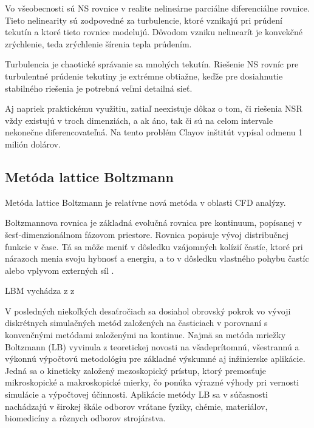 \documentclass[]{tukediphc}
\begin{document}
Vo všeobecnosti sú NS rovnice v realite nelineárne parciálne diferenciálne rovnice. Tieto nelinearity sú zodpovedné za turbulencie, ktoré vznikajú pri prúdení tekutín a ktoré tieto rovnice modelujú. Dôvodom vzniku nelinearít je konvekčné zrýchlenie, teda zrýchlenie šírenia tepla prúdením. 

Turbulencia je chaotické správanie sa mnohých tekutín. Riešenie NS rovníc pre turbulentné prúdenie tekutiny je extrémne obtiažne, keďže pre dosiahnutie stabilného riešenia je potrebná veľmi detailná sieť. 

Aj napriek praktickému využitiu, zatiaľ neexistuje dôkaz o tom, či riešenia NSR vždy existujú v troch dimenziách, a ak áno, tak či sú na celom intervale nekonečne diferencovateľná. Na tento problém Clayov inštitút vypísal odmenu 1 milión dolárov.

\subsection{Metóda lattice Boltzmann}

Metóda lattice Boltzmann je relatívne nová metóda v oblasti CFD analýzy.


\citep{delbosc2015}


Boltzmannova rovnica je základná evolučná rovnica pre kontinuum, popísanej v šesť-dimenzionálnom fázovom priestore. Rovnica popisuje vývoj distribučnej funkcie v čase. Tá sa môže meniť v dôsledku vzájomných kolízií častíc, ktoré pri nárazoch menia svoju hybnosť a energiu, a to v dôsledku vlastného pohybu častíc alebo vplyvom externých síl \citep{HEIDLER2011thesis}.

LBM vychádza z z 


V posledných niekoľkých desaťročiach sa dosiahol obrovský pokrok vo vývoji diskrétnych simulačných metód založených na časticiach v porovnaní s konvenčnými metódami založenými na kontinue. Najmä sa metóda mriežky Boltzmann (LB) vyvinula z teoretickej novosti na všadeprítomnú, všestrannú a výkonnú výpočtovú metodológiu pre základné výskumné aj inžinierske aplikácie. Jedná sa o kineticky založený mezoskopický prístup, ktorý premosťuje mikroskopické a makroskopické mierky, čo ponúka výrazné výhody pri vernosti simulácie a výpočtovej účinnosti. Aplikácie metódy LB sa v súčasnosti nachádzajú v širokej škále odborov vrátane fyziky, chémie, materiálov, biomedicíny a rôznych odborov strojárstva.
\end{document}
